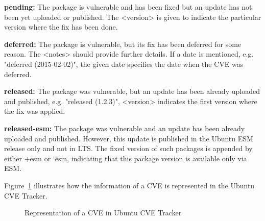 \documentclass[a4paper,num-refs]{oup-contemporary}
\begin{document}
\textbf{pending:} The package is vulnerable and
                  has been fixed but an update has not been yet uploaded or
		  published. The <version> is given to indicate the particular 
		  version where the fix has been done.

\textbf{deferred:} The package is vulnerable, but 
                   its fix has been deferred for some reason. The <notes>
		   should provide further details. If a date is mentioned, e.g.
		   "deferred (2015-02-02)", the given date specifies the date when
		   the CVE was deferred.

\textbf{released:} The package was vulnerable, but
		an update has been already uploaded and published, e.g. "released (1.2.3)",
		<version> indicates the first version where the fix was applied.

\textbf{released-esm:} The package was vulnerable and
		an update has been already uploaded and published. However,
		this update is published in the Ubuntu ESM release only and not in LTS.
		The fixed version of such packages is appended by either
		+esm or \char`\~esm, indicating that this package version is available
		only via ESM.

Figure~\ref{example} illustrates how the information of a CVE is represented
in the Ubuntu CVE Tracker.

\begin{figure}[!ht]
        \caption{\label{example} Representation of a CVE in Ubuntu CVE Tracker}
\end{figure}
\vspace*{-7mm}
\end{document}
